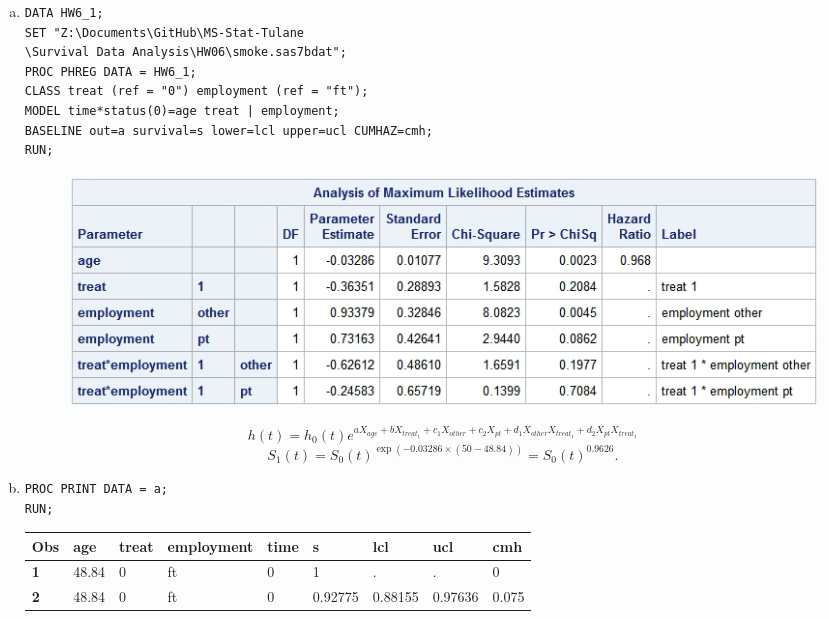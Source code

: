 \documentclass{elegantbook}
\begin{document}
\begin{solution}
    \begin{enumerate}[(a)]
        \item \begin{verbatim}
DATA HW6_1; 
SET "Z:\Documents\GitHub\MS-Stat-Tulane
\Survival Data Analysis\HW06\smoke.sas7bdat"; 
PROC PHREG DATA = HW6_1;
CLASS treat (ref = "0") employment (ref = "ft");
MODEL time*status(0)=age treat | employment;
BASELINE out=a survival=s lower=lcl upper=ucl CUMHAZ=cmh;
RUN; 
        \end{verbatim}
        \begin{figure}[H]
            \centering
            \includegraphics[width = .7\textwidth]{HW6_1.png}
        \end{figure}
        \[h(t)=h_0(t)e^{a X_{age}+b X_{treat_1}+c_1 X_{other}+c_2 X_{pt} + d_1X_{other}X_{treat_1}+ d_2X_{pt}X_{treat_1}}\]
        \[S_1(t)=S_0(t)^{\exp(-0.03286\times(50-48.84))}=S_0(t)^{0.9626}. \]
        \item \begin{verbatim}
PROC PRINT DATA = a; 
RUN; 
        \end{verbatim}
        \begin{footnotesize}
            \begin{longtable}[c]{lllllllll}
                \hline
                \textbf{Obs} & \textbf{age} & \textbf{treat} & \textbf{employment} & \textbf{time} & \textbf{s} & \textbf{lcl} & \textbf{ucl} & \textbf{cmh} \\ \hline
                \endfirsthead
                \endhead
                \hline
                \endfoot
                \endlastfoot
                \textbf{1}  & 48.84 & 0 & ft & 0   & 1       & .       & .       & 0       \\
                \textbf{2}  & 48.84 & 0 & ft & 0   & 0.92775 & 0.88155 & 0.97636 & 0.075   \\

\end{longtable}
\end{footnotesize}
\end{enumerate}
\end{solution}
\end{document}
